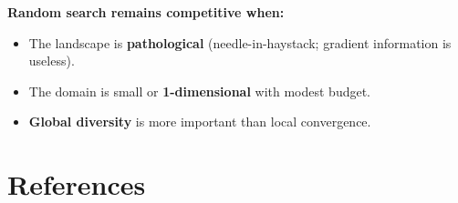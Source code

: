 \documentclass[12pt, a4paper]{article}
\begin{document}
\textbf{Random search remains competitive when:}
\begin{itemize}
  \item The landscape is \textbf{pathological} (needle-in-haystack;
        gradient information is useless).
  \item The domain is small or \textbf{1-dimensional} with modest budget.
  \item \textbf{Global diversity} is more important than local convergence.
\end{itemize}

\section*{References}
\end{document}
